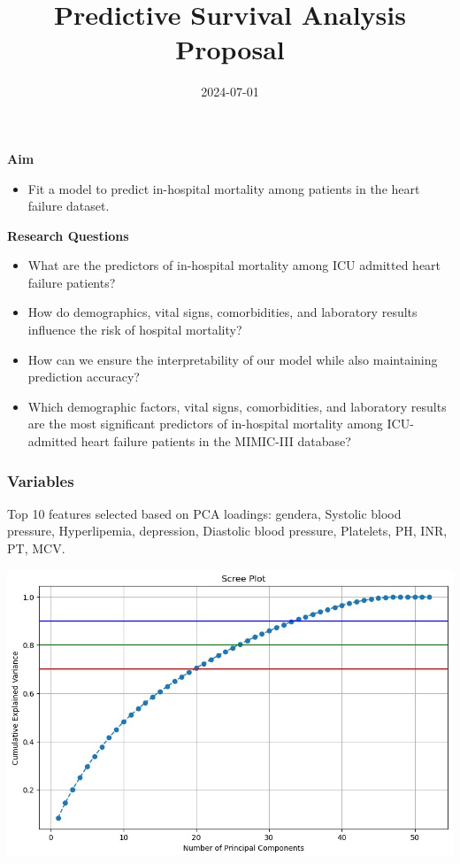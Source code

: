 \documentclass[
]{article}
\title{Predictive Survival Analysis Proposal}
\author{}
\date{\vspace{-2.5em}2024-07-01}
\providecommand{\tightlist}{%
  \setlength{\itemsep}{0pt}\setlength{\parskip}{0pt}}
\begin{document}
\maketitle

\textbf{Aim}

\begin{itemize}
\tightlist
\item
  Fit a model to predict in-hospital mortality among patients in the
  heart failure dataset.
\end{itemize}

\textbf{Research Questions}

\begin{itemize}
\item
  What are the predictors of in-hospital mortality among ICU admitted
  heart failure patients?
\item
  How do demographics, vital signs, comorbidities, and laboratory
  results influence the risk of hospital mortality?
\item
  How can we ensure the interpretability of our model while also
  maintaining prediction accuracy?
\item
  Which demographic factors, vital signs, comorbidities, and laboratory
  results are the most significant predictors of in-hospital mortality
  among ICU-admitted heart failure patients in the MIMIC-III database?
\end{itemize}

\hypertarget{variables}{%
\subsubsection{Variables}\label{variables}}

Top 10 features selected based on PCA loadings: gendera, Systolic blood
pressure, Hyperlipemia, depression, Diastolic blood pressure, Platelets,
PH, INR, PT, MCV.

\includegraphics{PCA.jpeg}
\end{document}
